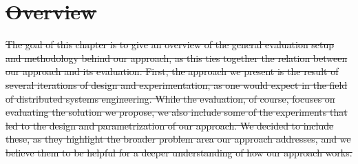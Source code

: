 \documentclass[draft,final]{vutinfth} %
\providecommand{\DIFdeltex}[1]{{\protect\color{red}\sout{#1}}}                      %
\providecommand{\DIFdelbegin}{} %
\providecommand{\DIFdel}[1]{\texorpdfstring{\DIFdeltex{#1}}{}} %
\begin{document}
\DIFdelbegin \chapter{\DIFdel{Overview}}
\addtocounter{chapter}{-1}%
\DIFdel{The goal of this chapter is to give an overview of the general evaluation setup and methodology behind our approach, as this ties together the relation between our approach and its evaluation.
First, the approach we present is the result of several iterations of design and experimentation, as one would expect in the field of distributed systems engineering.
While the evaluation, of course, focuses on evaluating the solution we propose, we also include some of the experiments that led to the design and parametrization of our approach.
We decided to include these, as they highlight the broader problem area our approach addresses, and we believe them to be helpful for a deeper understanding of how our approach works.
}%
\end{document}
